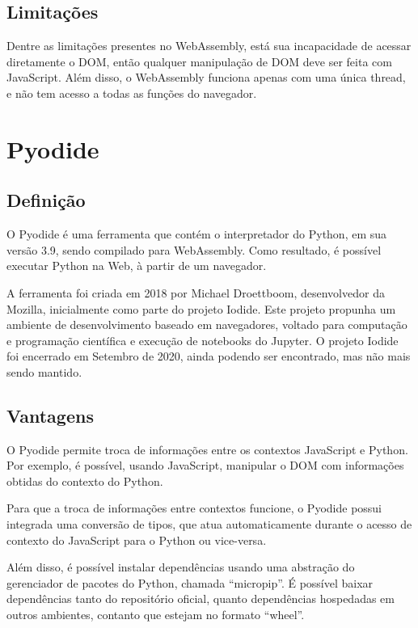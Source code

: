 \begin{apendicesenv}
\subsection{Limitações}

Dentre as limitações presentes no WebAssembly, está sua incapacidade de acessar diretamente o DOM, então qualquer manipulação de DOM deve ser feita com JavaScript. Além disso, o WebAssembly funciona apenas com uma única thread, e não tem acesso a todas as funções do navegador.


\section{Pyodide}

\subsection{Definição}

O Pyodide é uma ferramenta que contém o interpretador do Python, em sua versão 3.9, sendo compilado para WebAssembly. Como resultado, é possível executar Python na Web, à partir de um navegador.

A ferramenta foi criada em 2018 por Michael Droettboom, desenvolvedor da Mozilla, inicialmente como parte do projeto Iodide. Este projeto propunha um ambiente de desenvolvimento baseado em navegadores, voltado para computação e programação científica e execução de notebooks do Jupyter. O projeto Iodide foi encerrado em Setembro de 2020, ainda podendo ser encontrado, mas não mais sendo mantido.

\subsection{Vantagens}

O Pyodide permite troca de informações entre os contextos JavaScript e Python. Por exemplo, é possível, usando JavaScript, manipular o DOM com informações obtidas do contexto do Python.

Para que a troca de informações entre contextos funcione, o Pyodide possui integrada uma conversão de tipos, que atua automaticamente durante o acesso de contexto do JavaScript para o Python ou vice-versa.

Além disso, é possível instalar dependências usando uma abstração do gerenciador de pacotes do Python, chamada “micropip”. É possível baixar dependências tanto do repositório oficial, quanto dependências hospedadas em outros ambientes, contanto que estejam no formato ``wheel''.


\end{apendicesenv}
